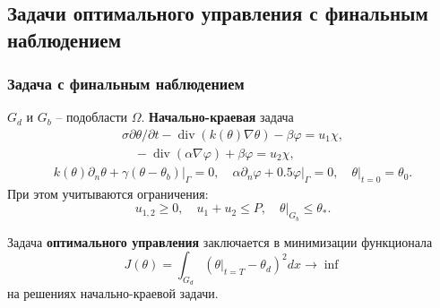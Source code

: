 \subsection{Задачи оптимального управления с финальным наблюдением}\label{subsec:final-check}
\begin{frame}
    \frametitle{Задача с финальным наблюдением}
    $G_{d}$ и $G_{b}$ -- подобласти $\Omega$.
    \textbf{Начально-краевая} задача
    \begin{gather}
        \label{eq:3_3:1}
        \sigma \partial \theta / \partial t-\operatorname{div}(k(\theta) \nabla \theta)
        -\beta \varphi=u_{1} \chi, \\
        \quad-\operatorname{div}(\alpha \nabla \varphi)+\beta \varphi= u_{2} \chi,
    \end{gather}
    \begin{gather}
        \label{eq:3_3:2}
        k(\theta) \partial_{n} \theta+\left.\gamma
        \left(\theta-\theta_{b}\right)\right|_{\Gamma}=0,
        \quad \alpha \partial_{n} \varphi +
        \left.0.5 \varphi\right|_{\Gamma}=0,\left.\quad \theta\right|_{t=0}=\theta_{0}.
    \end{gather}
    При этом учитываются ограничения:
    \[
        u_{1,2} \geq 0, \quad u_{1}+u_{2} \leq P,\left.\quad \theta\right|_{G_{b}} \leq \theta_{*}.
    \]

    Задача \textbf{оптимального управления} заключается в минимизации функционала
    \[
        J(\theta)=\int_{G_{d}}\left(\left.\theta\right|_{t=T}
        -\theta_{d}\right)^{2} d x \rightarrow \inf
    \]
    на решениях начально-краевой задачи.
\end{frame}

